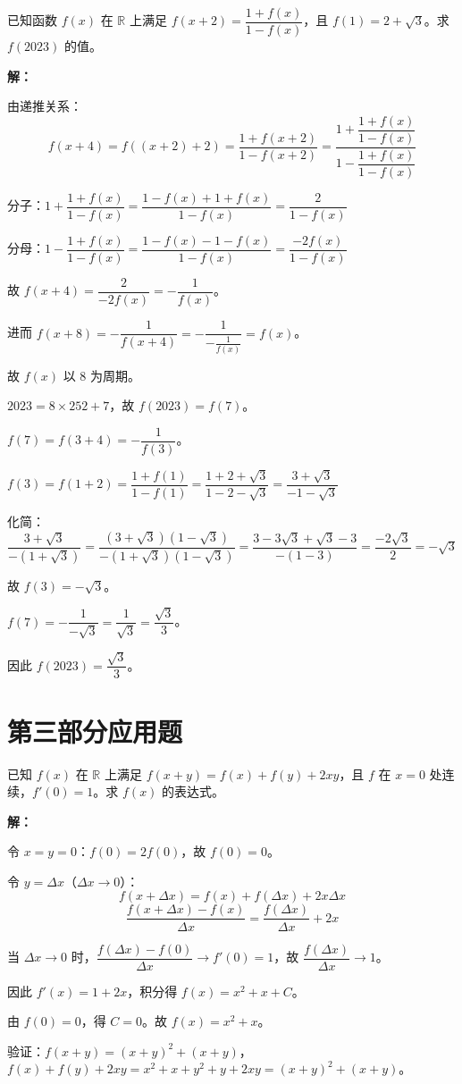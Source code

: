 \documentclass[12pt,a4paper]{ctexart}
\begin{document}
\begin{examplebox}[例11]
已知函数 $f(x)$ 在 $\mathbb{R}$ 上满足 $f(x+2)=\dfrac{1+f(x)}{1-f(x)}$，且 $f(1)=2+\sqrt{3}$。求 $f(2023)$ 的值。

\medskip
\textbf{解：}

由递推关系：
\[f(x+4)=f((x+2)+2)=\frac{1+f(x+2)}{1-f(x+2)}=\frac{1+\dfrac{1+f(x)}{1-f(x)}}{1-\dfrac{1+f(x)}{1-f(x)}}\]

分子：$1+\dfrac{1+f(x)}{1-f(x)}=\dfrac{1-f(x)+1+f(x)}{1-f(x)}=\dfrac{2}{1-f(x)}$

分母：$1-\dfrac{1+f(x)}{1-f(x)}=\dfrac{1-f(x)-1-f(x)}{1-f(x)}=\dfrac{-2f(x)}{1-f(x)}$

故 $f(x+4)=\dfrac{2}{-2f(x)}=-\dfrac{1}{f(x)}$。

进而 $f(x+8)=-\dfrac{1}{f(x+4)}=-\dfrac{1}{-\frac{1}{f(x)}}=f(x)$。

故 $f(x)$ 以 $8$ 为周期。

$2023=8\times252+7$，故 $f(2023)=f(7)$。

$f(7)=f(3+4)=-\dfrac{1}{f(3)}$。

$f(3)=f(1+2)=\dfrac{1+f(1)}{1-f(1)}=\dfrac{1+2+\sqrt{3}}{1-2-\sqrt{3}}=\dfrac{3+\sqrt{3}}{-1-\sqrt{3}}$

化简：$\dfrac{3+\sqrt{3}}{-(1+\sqrt{3})}=\dfrac{(3+\sqrt{3})(1-\sqrt{3})}{-(1+\sqrt{3})(1-\sqrt{3})}=\dfrac{3-3\sqrt{3}+\sqrt{3}-3}{-(1-3)}=\dfrac{-2\sqrt{3}}{2}=-\sqrt{3}$

故 $f(3)=-\sqrt{3}$。

$f(7)=-\dfrac{1}{-\sqrt{3}}=\dfrac{1}{\sqrt{3}}=\dfrac{\sqrt{3}}{3}$。

因此 $\boxed{f(2023)=\dfrac{\sqrt{3}}{3}}$。
\end{examplebox}


\newpage
\section*{\textcolor{mainblue}{第三部分\quad 应用题}}

\begin{appbox}[应用题1]
已知 $f(x)$ 在 $\mathbb{R}$ 上满足 $f(x+y)=f(x)+f(y)+2xy$，且 $f$ 在 $x=0$ 处连续，$f'(0)=1$。求 $f(x)$ 的表达式。

\medskip
\textbf{解：}

令 $x=y=0$：$f(0)=2f(0)$，故 $f(0)=0$。

令 $y=\Delta x$（$\Delta x\to0$）：
\[f(x+\Delta x)=f(x)+f(\Delta x)+2x\Delta x\]
\[\frac{f(x+\Delta x)-f(x)}{\Delta x}=\frac{f(\Delta x)}{\Delta x}+2x\]

当 $\Delta x\to0$ 时，$\dfrac{f(\Delta x)-f(0)}{\Delta x}\to f'(0)=1$，故 $\dfrac{f(\Delta x)}{\Delta x}\to1$。

因此 $f'(x)=1+2x$，积分得 $f(x)=x^2+x+C$。

由 $f(0)=0$，得 $C=0$。故 $\boxed{f(x)=x^2+x}$。

\medskip
验证：$f(x+y)=(x+y)^2+(x+y)$，$f(x)+f(y)+2xy=x^2+x+y^2+y+2xy=(x+y)^2+(x+y)$。\checkmark
\end{appbox}
\end{document}
